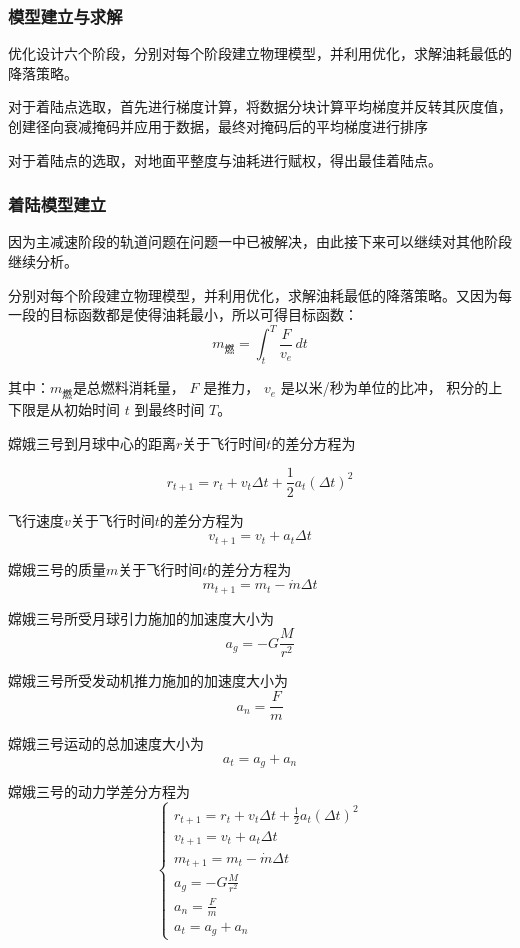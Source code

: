 \documentclass{ctexart}
\begin{document}
\subsubsection{模型建立与求解}
优化设计六个阶段，分别对每个阶段建立物理模型，并利用优化，求解油耗最低的降落策略。

对于着陆点选取，首先进行梯度计算，将数据分块计算平均梯度并反转其灰度值，创建径向衰减掩码并应用于数据，最终对掩码后的平均梯度进行排序

对于着陆点的选取，对地面平整度与油耗进行赋权，得出最佳着陆点。

\subsubsection{着陆模型建立}
因为主减速阶段的轨道问题在问题一中已被解决，由此接下来可以继续对其他阶段继续分析。

分别对每个阶段建立物理模型，并利用优化，求解油耗最低的降落策略。又因为每一段的目标函数都是使得油耗最小，所以可得目标函数：
\begin{equation}
m_{\text{燃}} = \int_{t}^{T} \frac{F}{v_e} \, dt
\end{equation}


其中：$m_{\text{燃}}$是总燃料消耗量，
$F$ 是推力，
$v_e$ 是以米/秒为单位的比冲，
积分的上下限是从初始时间 $t$ 到最终时间 $T$。


嫦娥三号到月球中心的距离\(r\)关于飞行时间\(t\)的差分方程为

\[r_{t+1} = r_t + v_t \Delta t + \frac{1}{2} a_t (\Delta t)^2\]

飞行速度\(v\)关于飞行时间\(t\)的差分方程为
\[v_{t+1} = v_t + a_t \Delta t\]

嫦娥三号的质量\(m\)关于飞行时间\(t\)的差分方程为
\[m_{t+1} = m_t - \dot{m} \Delta t\]

嫦娥三号所受月球引力施加的加速度大小为
\[a_g = - G \frac{M}{r^2}\]

嫦娥三号所受发动机推力施加的加速度大小为
\[a_n = \frac{F}{m}\]

嫦娥三号运动的总加速度大小为
\[a_t = a_g + a_n\]

嫦娥三号的动力学差分方程为
\[
\begin{cases}
r_{t+1} = r_t + v_t \Delta t + \frac{1}{2} a_t (\Delta t)^2 \\
v_{t+1} = v_t + a_t \Delta t \\
m_{t+1} = m_t - \dot{m} \Delta t \\
a_g = - G \frac{M}{r^2} \\
a_n = \frac{F}{m} \\
a_t = a_g + a_n
\end{cases}
\]
\end{document}
